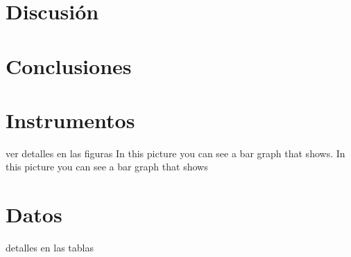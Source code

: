 \documentclass[man, floatsintext]{apa7}
\begin{document}
    \section{Discusión}
    \section{Conclusiones}
    \printbibliography
    \appendix
    \section{Instrumentos}
    \label{Ap. instrumentos}
    ver detalles en las figuras
    In this picture you can see a bar graph that shows. In this picture you can see a bar graph that shows
    \section{Datos}
    \label{Ap.Datos}
    detalles en las tablas
\end{document}

